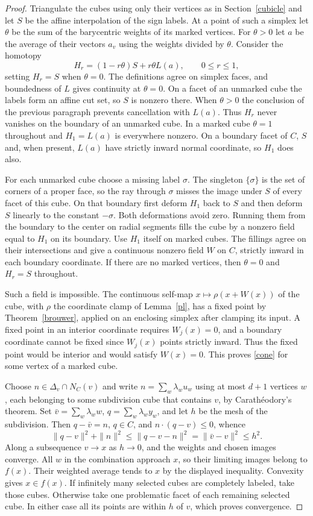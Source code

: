 \documentclass[11pt]{amsart}
\theoremstyle{definition}
\theoremstyle{remark}
\numberwithin{equation}{section}
\begin{document}
\begin{proof}
Triangulate the cubes using only their vertices as in Section~\ref{cubicle} and let $S$ be the affine interpolation of the sign labels. At a point of such a simplex let $\theta$ be the sum of the barycentric weights of its marked vertices. For $\theta>0$ let $a$ be the average of their vectors $a_v$ using the weights divided by $\theta$. Consider the homotopy
\[
      H_r=(1-r\theta)S+r\theta L(a),\qquad 0\le r\le1 ,
\]
setting $H_r=S$ when $\theta=0$. The definitions agree on simplex faces, and boundedness of $L$ gives continuity at $\theta=0$. On a facet of an unmarked cube the labels form an affine cut set, so $S$ is nonzero there. When $\theta>0$ the conclusion of the previous paragraph prevents cancellation with $L(a)$. Thus $H_r$ never vanishes on the boundary of an unmarked cube. In a marked cube $\theta=1$ throughout and $H_1=L(a)$ is everywhere nonzero. On a boundary facet of $C$, $S$ and, when present, $L(a)$ have strictly inward normal coordinate, so $H_1$ does also.

For each unmarked cube choose a missing label $\sigma$. The singleton $\{\sigma\}$ is the set of corners of a proper face, so the ray through $\sigma$ misses the image under $S$ of every facet of this cube. On that boundary first deform $H_1$ back to $S$ and then deform $S$ linearly to the constant $-\sigma$. Both deformations avoid zero. Running them from the boundary to the center on radial segments fills the cube by a nonzero field equal to $H_1$ on its boundary. Use $H_1$ itself on marked cubes. The fillings agree on their intersections and give a continuous nonzero field $W$ on $C$, strictly inward in each boundary coordinate. If there are no marked vertices, then $\theta=0$ and $H_r=S$ throughout.

Such a field is impossible. The continuous self-map $x\mapsto\rho(x+W(x))$ of the cube, with $\rho$ the coordinate clamp of Lemma~\ref{pl}, has a fixed point by Theorem~\ref{brouwer}, applied on an enclosing simplex after clamping its input. A fixed point in an interior coordinate requires $W_j(x)=0$, and a boundary coordinate cannot be fixed since $W_j(x)$ points strictly inward. Thus the fixed point would be interior and would satisfy $W(x)=0$. This proves \eqref{cone} for some vertex of a marked cube.

Choose $n\in \Delta_v\cap N_C(v)$ and write $n=\sum_w\lambda_w u_w$ using at most $d+1$ vertices $w$, each belonging to some subdivision cube that contains $v$, by Carath\'eodory's theorem. Set $\bar v=\sum_w\lambda_w w$, $q=\sum_w\lambda_w y_w$, and let $h$ be the mesh of the subdivision. Then $q-\bar v=n$, $q\in C$, and $n\cdot(q-v)\le0$, whence
\[
 \|q-v\|^2+\|n\|^2\le\|q-v-n\|^2=\|\bar v-v\|^2\le h^2.
\]
Along a subsequence $v\to x$ as $h\to0$, and the weights and chosen images converge. All $w$ in the combination approach $x$, so their limiting images belong to $f(x)$. Their weighted average tends to $x$ by the displayed inequality. Convexity gives $x\in f(x)$. If infinitely many selected cubes are completely labeled, take those cubes. Otherwise take one problematic facet of each remaining selected cube. In either case all its points are within $h$ of $v$, which proves convergence.
\end{proof}
\end{document}
